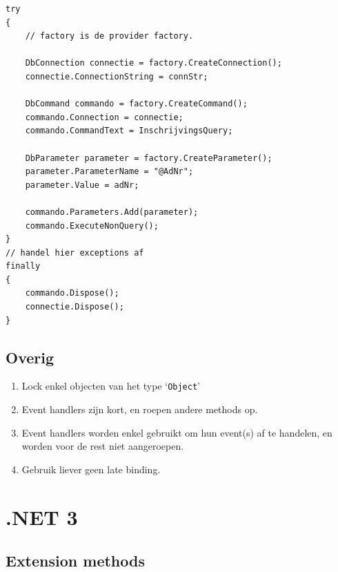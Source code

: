 \documentclass[a4paper,11pt]{article}
\begin{document}
\begin{lstlisting}[float, caption=ADO.NET]
try
{
	// factory is de provider factory.

	DbConnection connectie = factory.CreateConnection();
	connectie.ConnectionString = connStr;

	DbCommand commando = factory.CreateCommand();
	commando.Connection = connectie;
	commando.CommandText = InschrijvingsQuery;
	
	DbParameter parameter = factory.CreateParameter();
	parameter.ParameterName = "@AdNr";
	parameter.Value = adNr;

	commando.Parameters.Add(parameter);
	commando.ExecuteNonQuery();
}
// handel hier exceptions af
finally
{
	commando.Dispose();
	connectie.Dispose();
}
\end{lstlisting}

\subsection{Overig}

\begin{enumerate}[resume]
\item Lock enkel objecten van het type `\lstinline !Object!'
\item Event handlers zijn kort, en roepen andere methods op.
\item Event handlers worden enkel gebruikt om hun event(s) af te handelen, en worden voor de rest
niet aangeroepen.
\item Gebruik liever geen late binding.
\end{enumerate}

\section{.NET 3}


\subsection{Extension methods}
\end{document}
